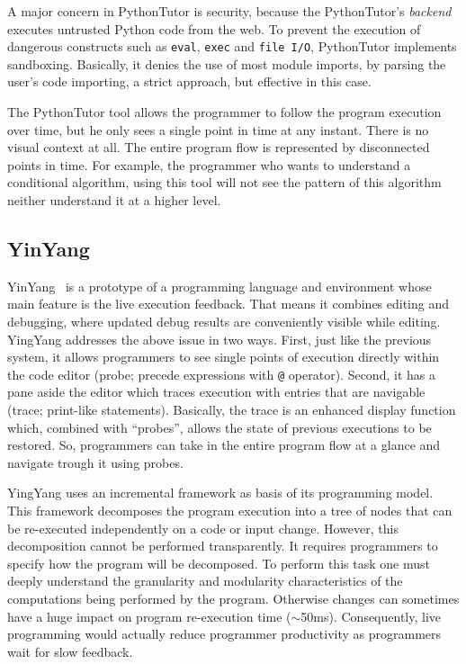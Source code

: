 A major concern in PythonTutor is security, because the PythonTutor's \textit{backend} executes untrusted Python code from the web. To prevent the execution of dangerous constructs such as {\tt eval}, {\tt exec} and {\tt file I/O}, PythonTutor implements sandboxing. Basically, it denies the use of most module imports, by parsing the user's code importing, a strict approach, but effective in this case.

The PythonTutor tool allows the programmer to follow the program execution over time, but he only sees a single point in time at any instant. There is no visual context at all. The entire program flow is represented by disconnected points in time. For example, the programmer who wants to understand a conditional algorithm, using this tool will not see the pattern of this algorithm neither understand it at a higher level.
\subsection{YinYang}
\label{subsec:yinyang}
YinYang~\citep{mcdirmid2013usable} is a prototype of a programming language and environment whose main feature is the live execution feedback. That means it combines editing and debugging, where updated debug results are conveniently visible while editing. YingYang addresses the above issue in two ways. First, just like the previous system, it allows programmers to see single points of execution directly within the code editor (probe; precede expressions with \texttt{@} operator). Second, it has a pane aside the editor which traces execution with entries that are navigable (trace; print-like statements). Basically, the trace is an enhanced display function which, combined with ``probes'', allows the state of previous executions to be restored. So, programmers can take in the entire program flow at a glance and navigate trough it using probes.

YingYang uses an incremental framework as basis of its programming model. This framework decomposes the program execution into a tree of nodes that can be re-executed independently on a code or input change. However, this decomposition cannot be performed transparently. It requires programmers to specify how the program will be decomposed. To perform this task one must deeply understand the granularity and modularity characteristics of the computations being performed by the program. Otherwise changes can sometimes have a huge impact on program re-execution time ($\sim$50ms). Consequently, live programming would actually reduce programmer productivity as programmers wait for slow feedback.

